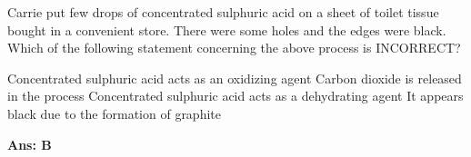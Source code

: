 \documentclass[border=3pt,varwidth=70mm]{standalone}
\begin{document}
Carrie put few drops of concentrated sulphuric acid on a sheet of toilet tissue bought in a convenient store. There were some holes and the edges were black. Which of the following statement concerning the above process is INCORRECT? 

\begin{choices}
\choice Concentrated sulphuric acid acts as an oxidizing agent
\choice Carbon dioxide is released in the process 
\choice Concentrated sulphuric acid acts as a dehydrating agent
\choice It appears black due to the formation of graphite
\end{choices}

\begin{answer}
\hrulefill\par
\textbf{Ans: B}


\end{answer}
\end{document}

